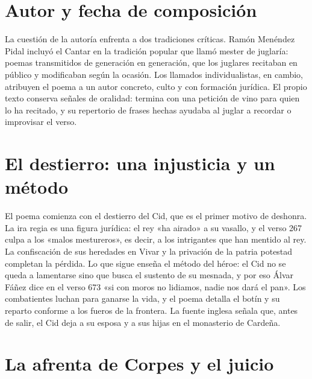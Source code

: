 \documentclass{book}
\begin{document}

\section{Autor y fecha de composición}

La cuestión de la autoría enfrenta a dos tradiciones críticas. Ramón Menéndez Pidal incluyó el Cantar en la tradición popular que llamó mester de juglaría: poemas transmitidos de generación en generación, que los juglares recitaban en público y modificaban según la ocasión. Los llamados individualistas, en cambio, atribuyen el poema a un autor concreto, culto y con formación jurídica. El propio texto conserva señales de oralidad: termina con una petición de vino para quien lo ha recitado, y su repertorio de frases hechas ayudaba al juglar a recordar o improvisar el verso.


\section{El destierro: una injusticia y un método}

El poema comienza con el destierro del Cid, que es el primer motivo de deshonra. La ira regia es una figura jurídica: el rey «ha airado» a su vasallo, y el verso 267 culpa a los «malos mestureros», es decir, a los intrigantes que han mentido al rey. La confiscación de sus heredades en Vivar y la privación de la patria potestad completan la pérdida. Lo que sigue enseña el método del héroe: el Cid no se queda a lamentarse sino que busca el sustento de su mesnada, y por eso Álvar Fáñez dice en el verso 673 «si con moros no lidiamos, nadie nos dará el pan». Los combatientes luchan para ganarse la vida, y el poema detalla el botín y su reparto conforme a los fueros de la frontera. La fuente inglesa señala que, antes de salir, el Cid deja a su esposa y a sus hijas en el monasterio de Cardeña.


\section{La afrenta de Corpes y el juicio}
\end{document}
